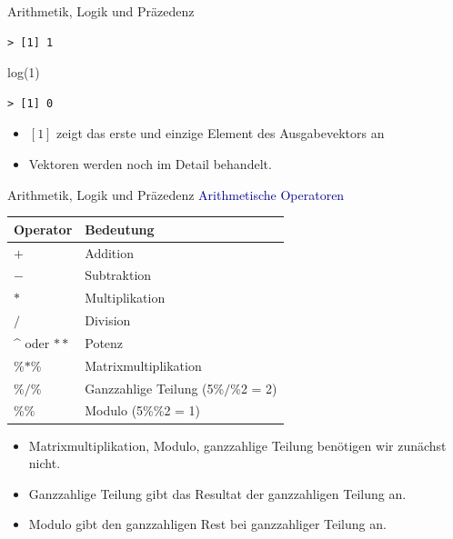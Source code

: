 \documentclass[
  8pt,
  ignorenonframetext,
]{beamer}
\newenvironment{Shaded}{\begin{snugshade}}{\end{snugshade}}
\newcommand{\DecValTok}[1]{\textcolor[rgb]{0.00,0.00,0.81}{#1}}
\newcommand{\FunctionTok}[1]{\textcolor[rgb]{0.00,0.00,0.00}{#1}}
\newcommand{\NormalTok}[1]{#1}
\providecommand{\tightlist}{%
  \setlength{\itemsep}{0pt}\setlength{\parskip}{0pt}}
\begin{document}
\begin{frame}[fragile]{Arithmetik, Logik und Präzedenz}
\begin{verbatim}
> [1] 1
\end{verbatim}

\begin{Shaded}
\begin{Highlighting}[]
\FunctionTok{log}\NormalTok{(}\DecValTok{1}\NormalTok{)}
\end{Highlighting}
\end{Shaded}

\begin{verbatim}
> [1] 0
\end{verbatim}

\begin{itemize}
\item $[1]$ zeigt das erste und einzige Element des Ausgabevektors an
\item Vektoren werden noch im Detail behandelt.
\end{itemize}
\end{frame}

\begin{frame}{Arithmetik, Logik und Präzedenz}
\protect\hypertarget{arithmetik-logik-und-pruxe4zedenz-1}{}
\textcolor{darkblue}{Arithmetische Operatoren} \vspace{4mm}

\small
\begin{center}
\begin{tabular}{l|l}
Operator            & Bedeutung                             \\\hline
$+$                 & Addition                              \\
$-$                 & Subtraktion                           \\
$*$                 & Multiplikation                        \\
$/$                 & Division                              \\
\^{} oder $**$      & Potenz                                \\
\%$*$\%             & Matrixmultiplikation                  \\
\%$/$\%             & Ganzzahlige Teilung (5\%$/$\%2 = 2)   \\
\%\%                & Modulo (5\%\%2 = 1)                   \\
\end{tabular}
\end{center}
\vspace{4mm}

\begin{itemize}
\tightlist
\item
  Matrixmultiplikation, Modulo, ganzzahlige Teilung benötigen wir
  zunächst nicht.
\item
  Ganzzahlige Teilung gibt das Resultat der ganzzahligen Teilung an.
\item
  Modulo gibt den ganzzahligen Rest bei ganzzahliger Teilung an.
\end{itemize}
\end{frame}
\end{document}
